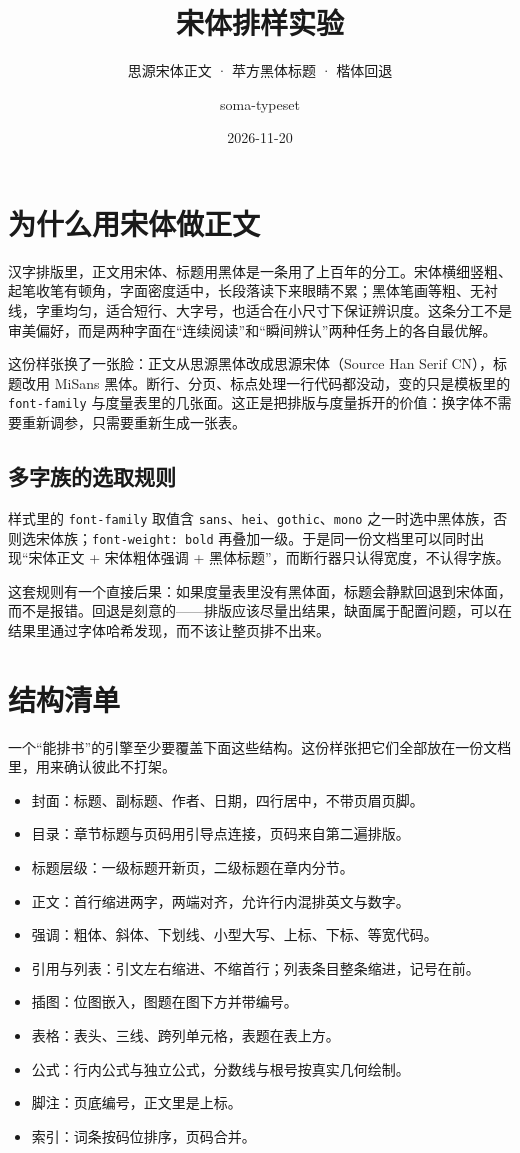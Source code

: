 \documentclass{article}
\title{宋体排样实验}
\subtitle{思源宋体正文 · 苹方黑体标题 · 楷体回退}
\author{soma-typeset}
\date{2026-11-20}
\begin{document}
\section{为什么用宋体做正文}

汉字排版里，正文用宋体、标题用黑体是一条用了上百年的分工。宋体横细竖粗、起笔收笔有顿角，字面密度适中，长段落读下来眼睛不累；黑体笔画等粗、无衬线，字重均匀，适合短行、大字号，也适合在小尺寸下保证辨识度。这条分工不是审美偏好，而是两种字面在“连续阅读”和“瞬间辨认”两种任务上的各自最优解。

这份样张换了一张脸：正文从思源黑体改成思源宋体（Source Han Serif CN），标题改用 MiSans 黑体。断行、分页、标点处理一行代码都没动，变的只是模板里的 \texttt{font-family} 与度量表里的几张面。这正是把排版与度量拆开的价值：换字体不需要重新调参，只需要重新生成一张表。

\subsection{多字族的选取规则}

样式里的 \texttt{font-family} 取值含 \texttt{sans}、\texttt{hei}、\texttt{gothic}、\texttt{mono} 之一时选中黑体族，否则选宋体族；\texttt{font-weight: bold} 再叠加一级。于是同一份文档里可以同时出现“宋体正文 + 宋体粗体强调 + 黑体标题”，而断行器只认得宽度，不认得字族。

这套规则有一个直接后果：如果度量表里没有黑体面，标题会静默回退到宋体面，而不是报错。回退是刻意的——排版应该尽量出结果，缺面属于配置问题，可以在结果里通过字体哈希发现，而不该让整页排不出来。

\section{结构清单}

一个“能排书”的引擎至少要覆盖下面这些结构。这份样张把它们全部放在一份文档里，用来确认彼此不打架。

\begin{itemize}
\item 封面：标题、副标题、作者、日期，四行居中，不带页眉页脚。
\item 目录：章节标题与页码用引导点连接，页码来自第二遍排版。
\item 标题层级：一级标题开新页，二级标题在章内分节。
\item 正文：首行缩进两字，两端对齐，允许行内混排英文与数字。
\item 强调：粗体、斜体、下划线、小型大写、上标、下标、等宽代码。
\item 引用与列表：引文左右缩进、不缩首行；列表条目整条缩进，记号在前。
\item 插图：位图嵌入，图题在图下方并带编号。
\item 表格：表头、三线、跨列单元格，表题在表上方。
\item 公式：行内公式与独立公式，分数线与根号按真实几何绘制。
\item 脚注：页底编号，正文里是上标。
\item 索引：词条按码位排序，页码合并。
\end{itemize}
\end{document}
